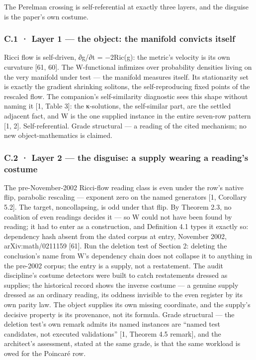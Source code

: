 \documentclass[10pt]{article}
\renewcommand{\_}{\origunderscore\allowbreak}
\begin{document}
The Perelman crossing is self-referential at exactly three layers, and
the disguise is the paper's own costume.

\hypertarget{c.1-layer-1-the-object-the-manifold-convicts-itself}{%
\subsubsection{C.1 · Layer 1 --- the object: the manifold convicts
itself}\label{c.1-layer-1-the-object-the-manifold-convicts-itself}}

Ricci flow is self-driven, ∂g/∂t = −2Ric(g): the metric's velocity is
its own curvature {[}61, 60{]}. The W-functional infimizes over
probability densities living on the very manifold under test --- the
manifold measures itself. Its stationarity set is exactly the gradient
shrinking solitons, the self-reproducing fixed points of the rescaled
flow. The companion's self-similarity diagnostic sees this shape without
naming it {[}1, Table 3{]}: the κ-solutions, the self-similar part, are
the settled adjacent fact, and W is the one supplied instance in the
entire seven-row pattern {[}1, 2{]}. Self-referential. Grade structural
--- a reading of the cited mechanism; no new object-mathematics is
claimed.

\hypertarget{c.2-layer-2-the-disguise-a-supply-wearing-a-readings-costume}{%
\subsubsection{C.2 · Layer 2 --- the disguise: a supply wearing a
reading's
costume}\label{c.2-layer-2-the-disguise-a-supply-wearing-a-readings-costume}}

The pre-November-2002 Ricci-flow reading class is even under the row's
native flip, parabolic rescaling --- exponent zero on the named
generators {[}1, Corollary 5.2{]}. The target, noncollapsing, is odd
under that flip. By Theorem 2.3, no coalition of even readings decides
it --- so W could not have been found by reading; it had to enter as a
construction, and Definition 4.1 types it exactly so: dependency hash
absent from the dated corpus at entry, November 2002, arXiv:math/0211159
{[}61{]}. Run the deletion test of Section 2: deleting the conclusion's
name from W's dependency chain does not collapse it to anything in the
pre-2002 corpus; the entry is a supply, not a restatement. The audit
discipline's costume detectors were built to catch restatements dressed
as supplies; the historical record shows the inverse costume --- a
genuine supply dressed as an ordinary reading, its oddness invisible to
the even register by its own parity law. The object supplies its own
missing coordinate, and the supply's decisive property is its
provenance, not its formula. Grade structural --- the deletion test's
own remark admits its named instances are ``named test candidates, not
executed validations'' {[}1, Theorem 4.5 remark{]}, and the architect's
assessment, stated at the same grade, is that the same workload is owed
for the Poincaré row.
\end{document}
